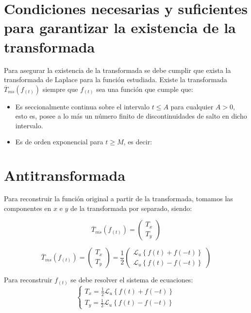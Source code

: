\documentclass[12pt]{article}
\begin{document}
\section{Condiciones necesarias y suficientes para garantizar la existencia de la transformada}

Para asegurar la existencia de la transformada se debe cumplir que exista la transformada de Laplace para la función estudiada. Existe la transformada $\overline{T}_{ms}(f_{(t)})$ siempre que $f_{(t)}$ sea una función que cumple que:

\begin{itemize}
\item Es seccionalmente continua sobre el intervalo $t \le A$ para cualquier $A > 0$, esto es, posee a lo más un número finito de discontinuidades de salto en dicho intervalo.
\item Es de orden exponencial para $t \ge M$, es decir:
\end{itemize}


\section{Antitransformada}

Para reconstruir la función original a partir de la transformada, tomamos las componentes en $x$ e $y$ de la transformada por separado, siendo:

$$\overline{T}_{ms}(f_{(t)}) =
\begin{pmatrix}
T_x\\
T_y
\end{pmatrix}
$$


$$\overline{T}_{ms}(f_{(t)}) =
\begin{pmatrix}
T_x\\
T_y
\end{pmatrix} =\frac12
\begin{pmatrix}
\mathcal{L}_u\left\{f(t) + f(-t)\right\}\\[0.2 cm]
\mathcal{L}_u\left\{f(t) -f(-t)\right\}
\end{pmatrix}
$$


Para reconstruir $f_{(t)}$ se debe resolver el sistema de ecuaciones:
$$
\begin{cases}
T_x =\frac12 \mathcal{L}_u\left\{f(t) + f(-t)\right\}\\[0.2 cm]
T_y = \frac12 \mathcal{L}_u\left\{f(t) -f(-t)\right\}
\end{cases}
$$
\end{document}
